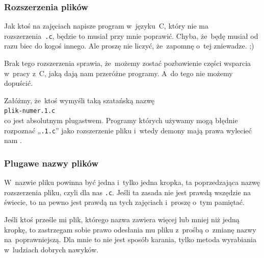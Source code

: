\documentclass[10pt,t]{beamer}
\begin{document}
\begin{frame}
  \frametitle{Rozszerzenia plików}


  Jak ktoś na zajęciach napisze program w~języku~C, który \alert{nie} ma
  rozszerzenia~\texttt{.c}, będzie to musiał przy mnie poprawić.
  Chyba, że~będę musiał od razu biec do kogoś innego. Ale proszę nie
  liczyć, że~zapomnę o~tej zniewadze. ;)

  Brak tego rozszerzenia sprawia, że~możemy zostać pozbawienie części
  wsparcia w~pracy z~C, jaką dają nam przeróżne programy. A~do tego
  \alert{nie} możemy dopuścić.

  Załóżmy, że~ktoś wymyśli taką szatańską nazwę \\
  \texttt{plik-numer.1.c} \\
  co jest absolutnym plugastwem. Programy których używamy mogą błędnie
  rozpoznać „\texttt{.1.c}” jako rozszerzenie pliku i~wtedy demony mają
  prawa wylecieć nam
  .


\end{frame}





\begin{frame}
  \frametitle{Plugawe nazwy plików}


  W~nazwie pliku powinna być \alert{jedna i~tylko jedna kropka}, ta
  poprzedzająca nazwę rozszerzenia pliku, czyli dla nas \texttt{.c}.
  Jeśli ta zasada nie jest prawdą wszędzie na świecie, to na pewno jest
  prawdą na tych zajęciach i~proszę o~tym pamiętać.

  Jeśli ktoś prześle mi plik, którego nazwa zawiera więcej lub mniej niż
  \alert{jedną} kropkę, to zastrzegam sobie prawo odesłania mu pliku
  z~prośbą o~zmianę nazwy na~poprawniejszą. Dla mnie to nie jest sposób
  karania, tylko metoda wyrabiania w~ludziach dobrych nawyków.

\end{frame}
\end{document}

